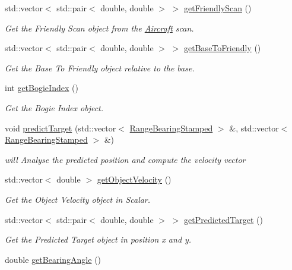 \begin{DoxyCompactItemize}
std\+::vector$<$ std\+::pair$<$ double, double $>$ $>$ \hyperlink{classScanner_a32f7e7f5ff6ac8f048263e26b059aae9}{get\+Friendly\+Scan} ()
\begin{DoxyCompactList}\small\item\em Get the Friendly Scan object from the \hyperlink{structAircraft}{Aircraft} scan. \end{DoxyCompactList}\item 
std\+::vector$<$ std\+::pair$<$ double, double $>$ $>$ \hyperlink{classScanner_a5b8ec13e023aef168abc91716d22bbb2}{get\+Base\+To\+Friendly} ()
\begin{DoxyCompactList}\small\item\em Get the Base To Friendly object relative to the base. \end{DoxyCompactList}\item 
int \hyperlink{classScanner_a22fe48ec9b56a6475f5e8a8745adca1f}{get\+Bogie\+Index} ()
\begin{DoxyCompactList}\small\item\em Get the Bogie Index object. \end{DoxyCompactList}\item 
void \hyperlink{classScanner_ae744985c5a046805010a9388cedaa006}{predict\+Target} (std\+::vector$<$ \hyperlink{structRangeBearingStamped}{Range\+Bearing\+Stamped} $>$ \&, std\+::vector$<$ \hyperlink{structRangeBearingStamped}{Range\+Bearing\+Stamped} $>$ \&)
\begin{DoxyCompactList}\small\item\em will Analyse the predicted position and compute the velocity vector \end{DoxyCompactList}\item 
std\+::vector$<$ double $>$ \hyperlink{classScanner_ac9b03f1f8b6f38f6f8144affa6be9854}{get\+Object\+Velocity} ()
\begin{DoxyCompactList}\small\item\em Get the Object Velocity object in Scalar. \end{DoxyCompactList}\item 
std\+::vector$<$ std\+::pair$<$ double, double $>$ $>$ \hyperlink{classScanner_a4f9ba72b2339cad7e3cb7ffe46196ea2}{get\+Predicted\+Target} ()
\begin{DoxyCompactList}\small\item\em Get the Predicted Target object in position x and y. \end{DoxyCompactList}\item 
double \hyperlink{classScanner_a222da6748f943d345a926d5a7094795e}{get\+Bearing\+Angle} ()

\end{DoxyCompactItemize}
